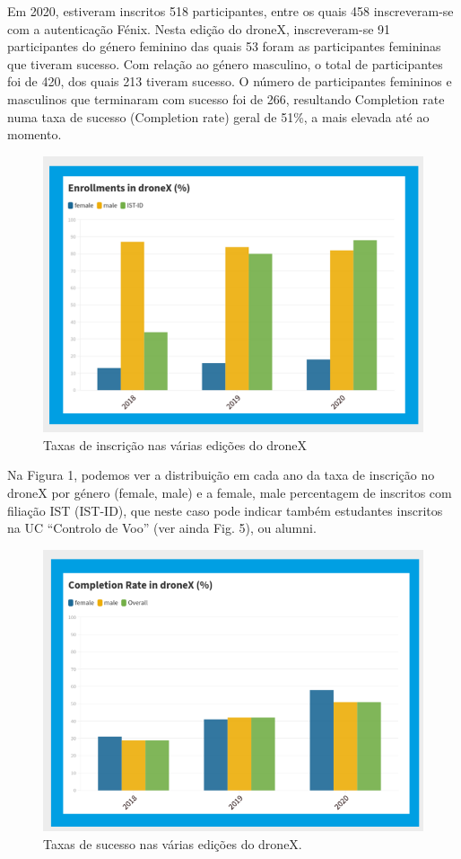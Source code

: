 Em 2020, estiveram inscritos 518 participantes,
entre os quais 458 inscreveram-se com a
autenticação Fénix. Nesta edição do droneX,
inscreveram-se 91 participantes do género
feminino das quais 53 foram as participantes
femininas que tiveram sucesso. Com relação ao
género masculino, o total de participantes foi de 420, dos quais 213 tiveram sucesso. O número de participantes femininos e masculinos que
terminaram com sucesso foi de 266, resultando
Completion rate numa taxa de sucesso (Completion rate) geral de 51\%, a mais elevada até ao momento.

\begin{figure}
    \centering
    \includegraphics[width=.9\textwidth]{chaps/Images/taxa_insc_dronex.png}
    \caption{Taxas de inscrição nas várias edições do droneX}
    \label{fig:taxa_insc_dronex}
\end{figure}

Na Figura 1, podemos ver a distribuição
em cada ano da taxa de inscrição no
droneX por género (female, male) e a female, male percentagem de inscritos com filiação
IST (IST-ID), que neste caso pode indicar também estudantes inscritos na UC “Controlo de Voo” (ver ainda Fig. 5), ou alumni.

\begin{figure}
    \centering
    \includegraphics[width=.9\textwidth]{chaps/Images/taxa_sucesso_dronex.png}
    \caption{Taxas de sucesso nas várias edições do droneX.}
    \label{fig:taxa_sucesso_dronex}
\end{figure}

